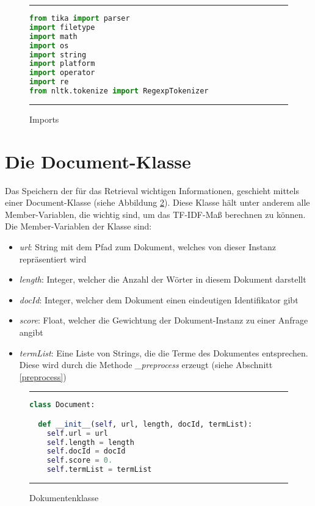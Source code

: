 \begin{figure}
	\rule{\textwidth}{0.4pt}
		\begin{lstlisting}[language=Python]
from tika import parser
import filetype
import math
import os
import string
import platform
import operator
import re
from nltk.tokenize import RegexpTokenizer
		\end{lstlisting}
	\rule{\textwidth}{0.4pt}
	\caption{Imports}
	\label{fig:import}
\end{figure}

\section{Die Document-Klasse}\label{die-document-klasse}

Das Speichern der für das Retrieval wichtigen Informationen, geschieht mittels einer Document-Klasse (siehe Abbildung \ref{fig:document}). Diese Klasse hält unter anderem alle Member-Variablen, die wichtig sind, um das TF-IDF-Maß berechnen zu können. Die Member-Variablen der Klasse sind:
\begin{itemize}
	\item \textit{url}: String mit dem Pfad zum Dokument, welches von dieser Instanz repräsentiert wird
	\item \textit{length}: Integer, welcher die Anzahl der Wörter in diesem Dokument darstellt
	\item \textit{docId}: Integer, welcher dem Dokument einen eindeutigen Identifikator gibt
	\item \textit{score}: Float, welcher die Gewichtung der Dokument-Instanz zu einer Anfrage angibt
	\item \textit{termList}: Eine Liste von Strings, die die Terme des Dokumentes entsprechen. Diese wird durch die Methode \textit{\_preprocess} erzeugt (siehe Abschnitt \ref{preprocess})
\end{itemize} 

\begin{figure}
	\rule{\textwidth}{0.4pt}
		\begin{lstlisting}[language=Python]
class Document:

  def __init__(self, url, length, docId, termList):
    self.url = url
    self.length = length
    self.docId = docId
    self.score = 0.
    self.termList = termList
		\end{lstlisting}
	\rule{\textwidth}{0.4pt}
	\caption{Dokumentenklasse}
	\label{fig:document}
\end{figure}

